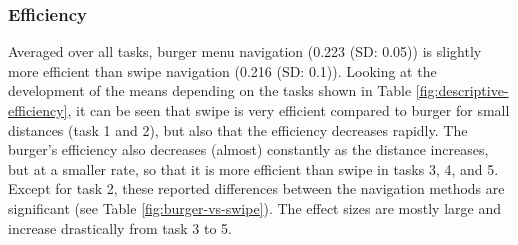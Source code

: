 \documentclass{sig-alternate-05-2015}
\begin{document}
\subsubsection{Efficiency}
Averaged over all tasks, burger menu navigation (0.223 (SD: 0.05)) is slightly more efficient than swipe navigation (0.216 (SD: 0.1)). Looking at the
development of the means depending on the tasks shown in Table \ref{fig:descriptive-efficiency}, it can be seen that swipe is very efficient compared to burger for small distances (task 1 and 2), 
but also that the efficiency decreases rapidly. The burger's efficiency also decreases (almost) constantly as the distance increases, but at a smaller rate, so that it is more efficient than swipe
in tasks 3, 4, and 5. Except for task 2, these reported differences between the navigation methods are significant (see Table \ref{fig:burger-vs-swipe}). The effect sizes are mostly large and
increase drastically from task 3 to 5.
\begin{table}[!h]
\centering
\caption{Mean (standard deviation) of efficiency}
\label{fig:descriptive-efficiency}
\end{table}
\end{document}
